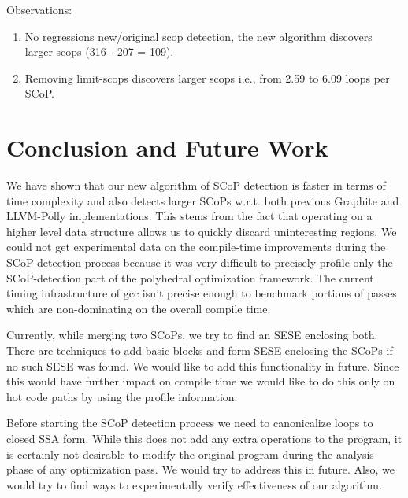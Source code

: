 \documentclass{sigplanconf}
\begin{document}
Observations:
\begin{enumerate}
  \item No regressions new/original scop detection, the new algorithm discovers
    larger scops (316 - 207 = 109).
  \item Removing limit-scops discovers larger scops i.e., from 2.59 to 6.09
    loops per SCoP.
\end{enumerate}

\section{Conclusion and Future Work}
We have shown that our new algorithm of SCoP detection is faster in terms of
time complexity and also detects larger SCoPs w.r.t. both previous Graphite and
LLVM-Polly implementations. This stems from the fact that operating on a higher
level data structure allows us to quickly discard uninteresting regions. We
could not get experimental data on the compile-time improvements during the SCoP
detection process because it was very difficult to precisely profile only the
SCoP-detection part of the polyhedral optimization framework. The current timing
infrastructure of gcc isn't precise enough to benchmark portions of passes which
are non-dominating on the overall compile time.

Currently, while merging two SCoPs, we try to find an SESE enclosing both. There
are techniques to add basic blocks and form SESE enclosing the SCoPs if no such
SESE was found. We would like to add this functionality in future. Since this
would have further impact on compile time we would like to do this only on hot
code paths by using the profile information.

Before starting the SCoP detection process we need to canonicalize loops to
closed SSA form. While this does not add any extra operations to the program, it
is certainly not desirable to modify the original program during the analysis
phase of any optimization pass. We would try to address this in future.  Also,
we would try to find ways to experimentally verify effectiveness of our
algorithm.


{\small

}
\end{document}
